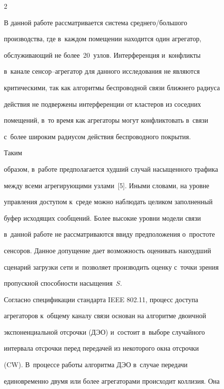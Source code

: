 \begin{multicols}{2}
     


    В данной работе рассматривается система среднего/большого 


производства, где в~каждом помещении находится один агрегатор, 


обслуживающий не более~20~узлов. Интерференция и~конфликты 


в~канале сен\-сор--аг\-ре\-га\-тор для данного исследования не являются 


критическими, так как алгоритмы беспроводной связи ближнего радиуса 


действия не подвержены интерференции от кластеров из соседних 


помещений, в~то время как агрегаторы могут конфликтовать в~связи 


с~более широким радиусом действия беспроводного покрытия. 





Таким 


образом, в~работе предполагается худший случай насыщенного трафика 


между всеми агрегирующими узлами~[5]. Иными словами, на уровне 


управления доступом к~среде можно наблюдать целиком заполненный 


буфер исходящих сообщений. Более высокие уровни модели связи 


в~данной работе не рассматриваются ввиду предположения о~прос\-то\-те 


сенсоров. Данное допущение дает возможность оценивать наихудший 


сценарий загрузки сети и~поз\-во\-ля\-ет производить оценку с~точки зрения 


пропускной способности насыщения~$S$.


    


    Согласно спецификации стандарта IEEE 802.11, процесс доступа 


агрегаторов к~общему каналу связи основан на алгоритме двоичной 


экспоненциальной отсрочки (ДЭО) и~состоит в~выборе случайного 


интервала отсрочки перед передачей из некоторого окна отсрочки 


(CW). В~процессе работы алгоритма ДЭО в~случае передачи 


единовременно двумя или более агрегаторами происходит коллизия. Она 



\end{multicols}
